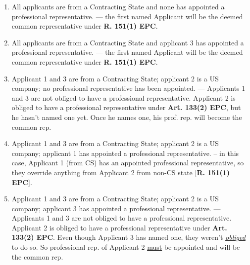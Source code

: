 \documentclass{report}
\begin{document}
\begin{enumerate}[label=\textbf{Answer \arabic*}]
\begin{enumerate}[label=\textbf{Answer \arabic*}]
    \begin{enumerate}[label=(\alph*)]
        \item All applicants are from a Contracting State and none has appointed a professional representative. --- the first named Applicant will be the deemed common representative under \textbf{R. 151(1) EPC}. 
        \item All applicants are from a Contracting State and applicant 3 has appointed a professional representative. --- the first named Applicant will be the deemed common representative under \textbf{R. 151(1) EPC}. 
        \item Applicant 1 and 3 are from a Contracting State; applicant 2 is a US company; no professional representative has been appointed. --- Applicants 1 and 3 are not obliged to have a professional representative. Applicant 2 is obliged to have a professional representative under \textbf{Art. 133(2) EPC}, but he hasn't named one yet. Once he names one, his prof. rep. will become the common rep. 
        \item Applicant 1 and 3 are from a Contracting State; applicant 2 is a US company; applicant 1 has appointed a professional representative. -- in this case, Applicant 1 (from CS) has an appointed professional representative, so they override anything from Applicant 2 from non-CS state [\textbf{R. 151(1) EPC}].
        \item Applicant 1 and 3 are from a Contracting State; applicant 2 is a US company; applicant 3 has appointed a professional representative. --- Applicants 1 and 3 are not obliged to have a professional representative. Applicant 2 is obliged to have a professional representative under \textbf{Art. 133(2) EPC}. Even though Applicant 3 has named one, they weren't \underline{\textit{obliged}} to do so. So professional rep. of Applicant 2 \underline{must} be appointed and will be the common rep. 
    \end{enumerate}

\end{enumerate}
\end{enumerate}
\end{document}
